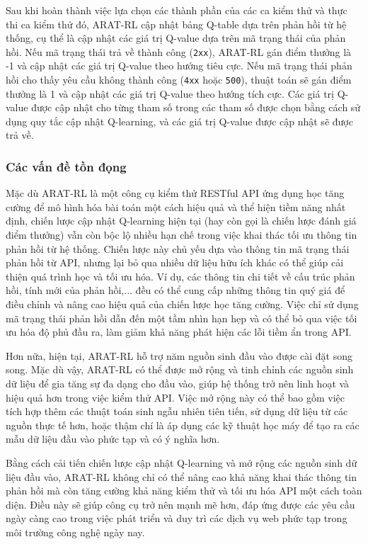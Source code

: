  Sau khi hoàn thành việc lựa chọn các thành phần của các ca kiểm thử và thực thi ca kiểm thử đó, ARAT-RL cập nhật bảng Q-table dựa trên phản hồi từ hệ thống, cụ thể là cập nhật các giá trị Q-value dựa trên mã trạng thái của phản hồi. Nếu mã trạng thái trả về thành công (\texttt{2xx}), ARAT-RL gán điểm thưởng là -1 và cập nhật các giá trị Q-value theo hướng tiêu cực. Nếu mã trạng thái phản hồi cho thấy yêu cầu không thành công (\texttt{4xx} hoặc \texttt{500}), thuật toán sẽ gán điểm thưởng là 1 và cập nhật các giá trị Q-value theo hướng tích cực. Các giá trị Q-value được cập nhật cho từng tham số trong các tham số được chọn bằng cách sử dụng quy tắc cập nhật Q-learning, và các giá trị Q-value được cập nhật sẽ được trả về.

\subsubsection{Các vấn đề tồn đọng}


Mặc dù ARAT-RL là một công cụ kiểm thử RESTful API ứng dụng học tăng cường để mô hình hóa bài toán một cách hiệu quả và thể hiện tiềm năng nhất định, chiến lược cập nhật Q-learning hiện tại (hay còn gọi là chiến lược đánh giá điểm thưởng) vẫn còn bộc lộ nhiều hạn chế trong việc khai thác tối ưu thông tin phản hồi từ hệ thống. Chiến lược này chủ yếu dựa vào thông tin mã trạng thái phản hồi từ API, nhưng lại bỏ qua nhiều dữ liệu hữu ích khác có thể giúp cải thiện quá trình học và tối ưu hóa. Ví dụ, các thông tin chi tiết về cấu trúc phản hồi, tính mới của phản hồi,... đều có thể cung cấp những thông tin quý giá để điều chỉnh và nâng cao hiệu quả của chiến lược học tăng cường. Việc chỉ sử dụng mã trạng thái phản hồi dẫn đến một tầm nhìn hạn hẹp và có thể bỏ qua việc tối ưu hóa độ phủ đầu ra, làm giảm khả năng phát hiện các lỗi tiềm ẩn trong API.

Hơn nữa, hiện tại, ARAT-RL hỗ trợ năm nguồn sinh đầu vào được cài đặt song song. Mặc dù vậy, ARAT-RL có thể được mở rộng và tinh chỉnh các nguồn sinh dữ liệu để gia tăng sự đa dạng cho đầu vào, giúp hệ thống trở nên linh hoạt và hiệu quả hơn trong việc kiểm thử API. Việc mở rộng này có thể bao gồm việc tích hợp thêm các thuật toán sinh ngẫu nhiên tiên tiến, sử dụng dữ liệu từ các nguồn thực tế hơn, hoặc thậm chí là áp dụng các kỹ thuật học máy để tạo ra các mẫu dữ liệu đầu vào phức tạp và có ý nghĩa hơn.

Bằng cách cải tiến chiến lược cập nhật Q-learning và mở rộng các nguồn sinh dữ liệu đầu vào, ARAT-RL không chỉ có thể nâng cao khả năng khai thác thông tin phản hồi mà còn tăng cường khả năng kiểm thử và tối ưu hóa API một cách toàn diện. Điều này sẽ giúp công cụ trở nên mạnh mẽ hơn, đáp ứng được các yêu cầu ngày càng cao trong việc phát triển và duy trì các dịch vụ web phức tạp trong môi trường công nghệ ngày nay.

